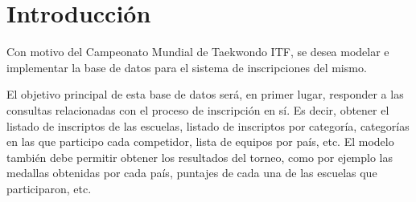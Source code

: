 \section{Introducci\'on}

Con motivo del Campeonato Mundial de Taekwon\-do ITF, se desea modelar e implementar la base de datos para el sistema de inscripciones del mismo. 

El objetivo principal de esta base de datos ser\'a, en primer lugar, responder a las consultas relacionadas con el proceso de inscripción en s\'i. Es decir, obtener el listado de inscriptos de las escuelas, listado de inscriptos por categoría, categorías en las que participo cada competidor, lista de equipos por país, etc. El modelo también debe permitir obtener los resultados del torneo, como por ejemplo las medallas obtenidas por cada país, puntajes de cada una de las escuelas que participaron, etc.